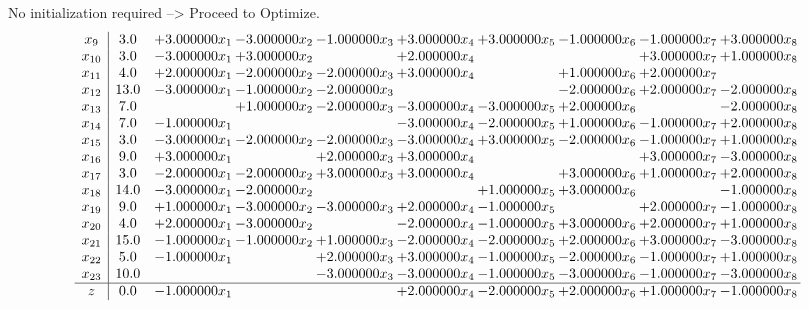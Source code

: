 \documentclass[10pt]{article}
\begin{document}
No initialization required --> Proceed to Optimize. 
\[\begin{array}{c| c c@{\hskip 2pt} c@{\hskip 2pt} c@{\hskip 2pt} c@{\hskip 2pt} c@{\hskip 2pt} c@{\hskip 2pt} c@{\hskip 2pt} c@{\hskip 2pt} }
 x_{9}   &  3.0 & + 3.000000 x_{1} & -3.000000 x_{2} & -1.000000 x_{3} & + 3.000000 x_{4} & + 3.000000 x_{5} & -1.000000 x_{6} & -1.000000 x_{7} & + 3.000000 x_{8}\\
 x_{10}   &  3.0 & -3.000000 x_{1} & + 3.000000 x_{2} &   & + 2.000000 x_{4} &    &   & + 3.000000 x_{7} & + 1.000000 x_{8}\\
 x_{11}   &  4.0 & + 2.000000 x_{1} & -2.000000 x_{2} & -2.000000 x_{3} & + 3.000000 x_{4} &   & + 1.000000 x_{6} & + 2.000000 x_{7} &   \\
 x_{12}   &  13.0 & -3.000000 x_{1} & -1.000000 x_{2} & -2.000000 x_{3} &    &   & -2.000000 x_{6} & + 2.000000 x_{7} & -2.000000 x_{8}\\
 x_{13}   &  7.0  &   & + 1.000000 x_{2} & -2.000000 x_{3} & -3.000000 x_{4} & -3.000000 x_{5} & + 2.000000 x_{6} &   & -2.000000 x_{8}\\
 x_{14}   &  7.0 & -1.000000 x_{1} &    &   & -3.000000 x_{4} & -2.000000 x_{5} & + 1.000000 x_{6} & -1.000000 x_{7} & + 2.000000 x_{8}\\
 x_{15}   &  3.0 & -3.000000 x_{1} & -2.000000 x_{2} & -2.000000 x_{3} & -3.000000 x_{4} & + 3.000000 x_{5} & -2.000000 x_{6} & -1.000000 x_{7} & + 1.000000 x_{8}\\
 x_{16}   &  9.0 & + 3.000000 x_{1} &   & + 2.000000 x_{3} & + 3.000000 x_{4} &    &   & + 3.000000 x_{7} & -3.000000 x_{8}\\
 x_{17}   &  3.0 & -2.000000 x_{1} & -2.000000 x_{2} & + 3.000000 x_{3} & + 3.000000 x_{4} &   & + 3.000000 x_{6} & + 1.000000 x_{7} & + 2.000000 x_{8}\\
 x_{18}   &  14.0 & -3.000000 x_{1} & -2.000000 x_{2} &    &   & + 1.000000 x_{5} & + 3.000000 x_{6} &   & -1.000000 x_{8}\\
 x_{19}   &  9.0 & + 1.000000 x_{1} & -3.000000 x_{2} & -3.000000 x_{3} & + 2.000000 x_{4} & -1.000000 x_{5} &   & + 2.000000 x_{7} & -1.000000 x_{8}\\
 x_{20}   &  4.0 & + 2.000000 x_{1} & -3.000000 x_{2} &   & -2.000000 x_{4} & -1.000000 x_{5} & + 3.000000 x_{6} & + 2.000000 x_{7} & + 1.000000 x_{8}\\
 x_{21}   &  15.0 & -1.000000 x_{1} & -1.000000 x_{2} & + 1.000000 x_{3} & -2.000000 x_{4} & -2.000000 x_{5} & + 2.000000 x_{6} & + 3.000000 x_{7} & -3.000000 x_{8}\\
 x_{22}   &  5.0 & -1.000000 x_{1} &   & + 2.000000 x_{3} & + 3.000000 x_{4} & -1.000000 x_{5} & -2.000000 x_{6} & -1.000000 x_{7} & + 1.000000 x_{8}\\
 x_{23}   &  10.0  &    &   & -3.000000 x_{3} & -3.000000 x_{4} & -1.000000 x_{5} & -3.000000 x_{6} & -1.000000 x_{7} & -3.000000 x_{8}\\
\hline
z    &  0.0 & -1.000000 x_{1} &    &   & + 2.000000 x_{4} & -2.000000 x_{5} & + 2.000000 x_{6} & + 1.000000 x_{7} & -1.000000 x_{8}\\
\end{array}\]
\end{document}
